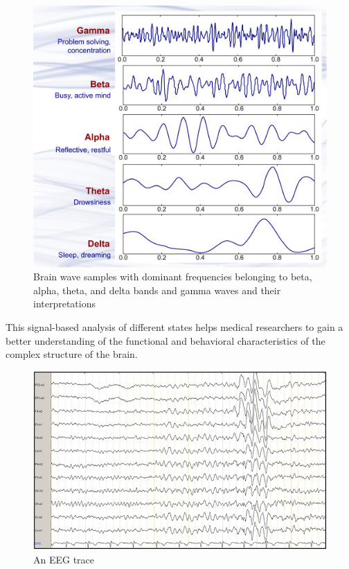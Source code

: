 \begin{figure}[ht]
    \centering
    \includegraphics{images/State-of-art/brainwaves.jpg}
    \caption{Brain wave samples with dominant frequencies belonging to beta, alpha, theta, and delta bands and gamma waves and their interpretations \cite{abhang_chapter_2016}}
    \label{fig:brainwaves}
\end{figure}

This signal-based analysis of different states helps medical researchers to gain a better understanding of the functional and behavioral characteristics of the complex structure of the brain.

\begin{figure}[ht]
    \centering
    \includegraphics[width=1.0\textwidth]{images/State-of-art/simple-eeg-trace.png}
    \caption{An \gls{EEG} trace \cite{tebartz_van_elst_increased_2016}}
    \label{fig:simple-eeg-trace}
\end{figure}

